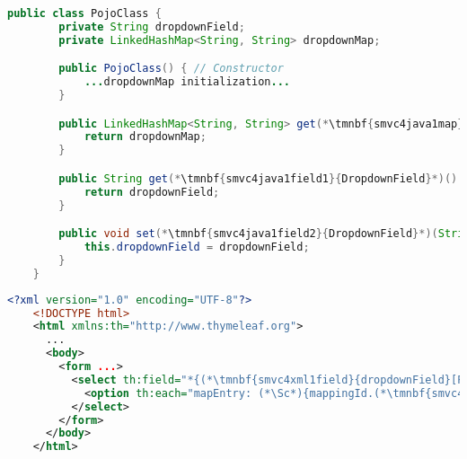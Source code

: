 \newpage

\begin{lstlisting}[language=Java, title={POJO class with one String field}]
    public class PojoClass {
        private String dropdownField;
        private LinkedHashMap<String, String> dropdownMap;

        public PojoClass() { // Constructor
            ...dropdownMap initialization...
        }

        public LinkedHashMap<String, String> get(*\tmnbf{smvc4java1map}{DropdownMap}*)() {
            return dropdownMap;
        }

        public String get(*\tmnbf{smvc4java1field1}{DropdownField}*)() {
            return dropdownField;
        }

        public void set(*\tmnbf{smvc4java1field2}{DropdownField}*)(String dropdownField) {
            this.dropdownField = dropdownField;
        }
    }
\end{lstlisting}
\begin{lstlisting}[language=XML, title={HTML form setting the field}]
    <?xml version="1.0" encoding="UTF-8"?>
    <!DOCTYPE html>
    <html xmlns:th="http://www.thymeleaf.org">
      ...
      <body>
        <form ...>
          <select th:field="*{(*\tmnbf{smvc4xml1field}{dropdownField}[ForestGreen]*)}">
            <option th:each="mapEntry: (*\Sc*){mappingId.(*\tmnbf{smvc4xml1map}{dropdownMap}[ForestGreen]*).entrySet()}" th:value="${mapEntry.key}" th:text="${mapEntry.value}"/>
          </select>
        </form>
      </body>
    </html>
\end{lstlisting}

